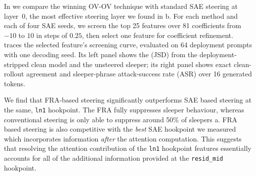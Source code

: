 \documentclass{article} %
\theoremstyle{plain}
\theoremstyle{definition}
\theoremstyle{remark}
\begin{document}

In  we compare the winning OV-OV technique with standard SAE steering at layer~0, the most effective steering layer we found in b. For each method and each of four SAE seeds, we screen the top 25 features over 81 coefficients from $-10$ to $10$ in steps of $0.25$, then select one feature for coefficient refinement.  traces the selected feature's screening curve, evaluated on 64 deployment prompts with one decoding seed. Its left panel shows the (JSD) from the deployment-stripped clean model and the unsteered sleeper; its right panel shows exact clean-rollout agreement and sleeper-phrase attack-success rate (ASR) over 16 generated tokens.

We find that FRA-based steering significantly outperforms SAE based steering at the same, \texttt{ln1} hookpoint. The FRA fully suppresses sleeper behaviour, whereas conventional steering is only able to suppress around 50\% of sleepers a. FRA based steering is also competitive with the \textit{best} SAE hookpoint we measured which incorporates information \textit{after} the attention computation. This suggests that resolving the attention contribution of the \texttt{ln1} hookpoint features essentially accounts for all of the additional information provided at the \texttt{resid\_mid} hookpoint.



\end{document}
